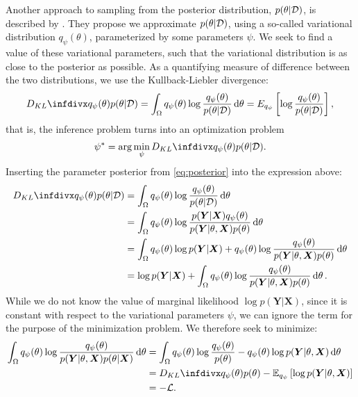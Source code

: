 Another approach to sampling from the posterior distribution, $p(\theta | \mathcal{D})$, is described by \autocite{blundell_weight_2015}. 
They propose we approximate $p(\theta | \mathcal{D})$, using a so-called variational distribution $q_\psi (\theta)$, parameterized by some parameters $\psi$.  
We seek to find a value of these variational parameters, such that the variational distribution is as close to the posterior as possible. 
As a quantifying measure of difference between the two distributions, we use the Kullback-Liebler divergence:
\begin{align}
    \kld{q_\psi(\theta)}{p(\theta|\D)} 
    = \int_{\Omega} q_\psi(\theta)\log{\frac{q_\psi(\theta)}{p(\theta|\D)}} \dd{\theta} 
    = E_{q_\psi}\left[\log{\frac{q_\psi(\theta)}{p(\theta|\D)}}\right],
\end{align}
that is, the inference problem turns into an optimization problem 
\begin{align}
    \psi^\ast=\arg\min_{\psi}{\kld{q_\psi(\theta)}{p(\theta|\D)} }.
\end{align} 
Inserting the parameter posterior from \cref{eq:posterior} into the expression above:
\begin{align}
    \kld{q_\psi(\theta)}{p(\theta|\D)} 
    &= \int_{\Omega} q_\psi(\theta)\log{\frac{q_\psi(\theta)}{p(\theta|\D)}} \dd{\theta} \\
    &= \int_{\Omega} q_\psi(\theta)\log{\frac{p(\bm{Y}|\bm{X})q_\psi(\theta)}{p(\bm{Y} |\theta, \bm{X}) p(\theta)}} \dd{\theta} \\
    &= \int_{\Omega} q_\psi(\theta)\log{p(\bm Y|\bm{X})} + q_\psi(\theta)\log{\frac{q_\psi(\theta)}{p(\bm{Y} |\theta, \bm{X}) p(\theta)}} \dd{\theta} \\
    &= \log{p(\bm{Y}|\bm{X})} + \int_{\Omega} q_\psi(\theta)\log{\frac{q_\psi(\theta)}{p(\bm{Y} |\theta, \bm{X}) p(\theta)}} \dd{\theta}.
\end{align}
While we do not know the value of marginal likelihood $\log{p(\bm{Y}|\bm{X})}$, since it is constant with respect to the variational parameters $\psi$, we can ignore the term for the purpose of the minimization problem.
We therefore seek to minimize:
\begin{align} \label{eq:elbo}
    \int_{\Omega} q_\psi(\theta)\log{\frac{q_\psi(\theta)}{p(\bm{Y} |\theta, \bm{X}) p(\theta|\bm{X})}} \dd{\theta} 
    &= \int_{\Omega} q_\psi(\theta) \log{\frac{q_\psi(\theta)}{p(\theta)}} -q_\psi(\theta)\log{p(\bm{Y} |\theta, \bm{X})} \dd{\theta}\\
    &= \kld{q_\psi(\theta)}{p(\theta)}  - \E_{q_\psi}\left[ \log{p(\bm{Y} |\theta, \bm{X})}  \right]  \\
    &= -\mathcal{L}.
\end{align}
